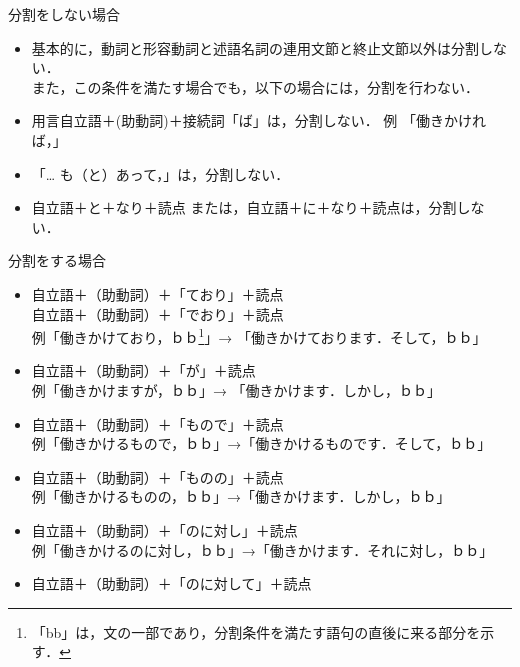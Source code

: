 \begin{list}{}{}
\item[1)] 分割をしない場合
\begin{itemize}
\item 基本的に，動詞と形容動詞と述語名詞の連用文節と終止文節以外は分割しない．\\
      また，この条件を満たす場合でも，以下の場合には，分割を行わない．
\item 用言自立語＋(助動詞)＋接続詞「ば」は，分割しない．  例  「働きかければ，」
\item 「… も（と）あって，」は，分割しない．
\item 自立語＋と＋なり＋読点 または，自立語＋に＋なり＋読点は，分割しない．
\end{itemize}
\item[2)] 分割をする場合
\begin{itemize}
\item 自立語＋（助動詞）＋「ており」＋読点\\
      自立語＋（助動詞）＋「でおり」＋読点\\
      例「働きかけており，ｂｂ\footnote{「bb」は，文の一部であり，分割条件を満たす語句の直後に来る部分を示す．}」→ 「働きかけております．そして，ｂｂ」
\item 自立語＋（助動詞）＋「が」＋読点\\
      例「働きかけますが，ｂｂ」→ 「働きかけます．しかし，ｂｂ」
\item 自立語＋（助動詞）＋「もので」＋読点\\
      例「働きかけるもので，ｂｂ」→「働きかけるものです．そして，ｂｂ」
\item 自立語＋（助動詞）＋「ものの」＋読点\\
      例「働きかけるものの，ｂｂ」→「働きかけます．しかし，ｂｂ」
\item 自立語＋（助動詞）＋「のに対し」＋読点\\
      例「働きかけるのに対し，ｂｂ」→「働きかけます．それに対し，ｂｂ」
\item 自立語＋（助動詞）＋「のに対して」＋読点\\

\end{itemize}
\end{list}
